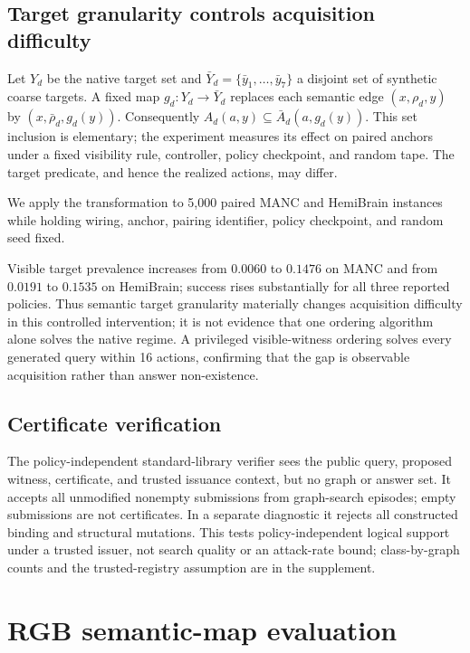 \documentclass{article}
\begin{document}
\subsection{Target granularity controls acquisition difficulty}

Let $Y_d$ be the native target set and
$\bar Y_d=\{\bar y_1,\ldots,\bar y_7\}$ a disjoint set of synthetic coarse
targets. A fixed map $g_d:Y_d\to\bar Y_d$ replaces each semantic edge
$(x,\rho_d,y)$ by $(x,\bar\rho_d,g_d(y))$.  Consequently
$A_d(a,y)\subseteq\bar A_d(a,g_d(y))$.  This set inclusion is elementary; the
experiment measures its effect on paired anchors under a fixed visibility rule,
controller, policy checkpoint, and random tape. The target predicate, and hence
the realized actions, may differ.

We apply the transformation to 5,000 paired MANC and HemiBrain instances while
holding wiring, anchor, pairing identifier, policy checkpoint, and random seed
fixed.

Visible target prevalence increases from $0.0060$ to $0.1476$ on MANC and from
$0.0191$ to $0.1535$ on HemiBrain; success rises substantially for all three
reported policies. Thus semantic target granularity materially changes acquisition difficulty in
this controlled intervention; it is not evidence that one ordering algorithm
alone solves the native regime. A privileged visible-witness ordering solves every generated query
within 16 actions, confirming that the gap is observable acquisition rather than
answer non-existence.




\subsection{Certificate verification}

The policy-independent standard-library verifier sees the public query, proposed witness,
certificate, and trusted issuance context, but no graph or answer set. It
accepts all \VerifierReplayCertificates{} unmodified nonempty submissions from
\VerifierReplayEpisodes{} graph-search episodes; empty submissions are not
certificates. In a separate diagnostic it rejects all
\VerifierMutationAttempts{} constructed binding and structural mutations. This
tests policy-independent logical support under a trusted issuer, not search
quality or an attack-rate bound; class-by-graph counts and the trusted-registry
assumption are in the supplement.

\section{RGB semantic-map evaluation}
\label{sec:route-memory}
\end{document}
